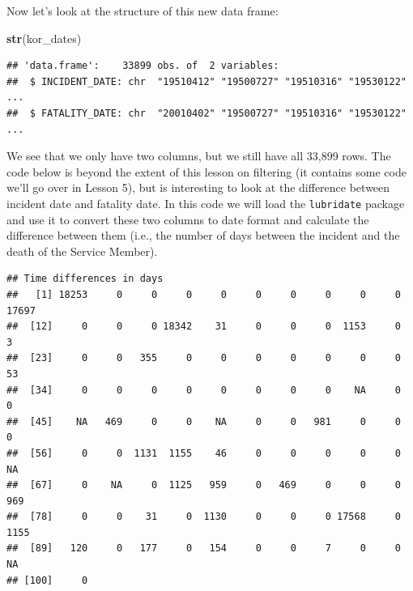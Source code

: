 \documentclass[]{book}
\newenvironment{Shaded}{\begin{snugshade}}{\end{snugshade}}
\newcommand{\KeywordTok}[1]{\textcolor[rgb]{0.13,0.29,0.53}{\textbf{{#1}}}}
\newcommand{\DecValTok}[1]{\textcolor[rgb]{0.00,0.00,0.81}{{#1}}}
\newcommand{\StringTok}[1]{\textcolor[rgb]{0.31,0.60,0.02}{{#1}}}
\newcommand{\NormalTok}[1]{{#1}}
\begin{document}
Now let's look at the structure of this new data frame:

\begin{Shaded}
\begin{Highlighting}[]
\KeywordTok{str}\NormalTok{(kor_dates)}
\end{Highlighting}
\end{Shaded}

\begin{verbatim}
## 'data.frame':    33899 obs. of  2 variables:
##  $ INCIDENT_DATE: chr  "19510412" "19500727" "19510316" "19530122" ...
##  $ FATALITY_DATE: chr  "20010402" "19500727" "19510316" "19530122" ...
\end{verbatim}

We see that we only have two columns, but we still have all 33,899 rows.
The code below is beyond the extent of this lesson on filtering (it
contains some code we'll go over in Lesson 5), but is interesting to
look at the difference between incident date and fatality date. In this
code we will load the \texttt{lubridate} package \citep{R-lubridate} and
use it to convert these two columns to date format and calculate the
difference between them (i.e., the number of days between the incident
and the death of the Service Member).

\begin{Shaded}
\end{Shaded}

\begin{verbatim}
## Time differences in days
##   [1] 18253     0     0     0     0     0     0     0     0     0 17697
##  [12]     0     0     0 18342    31     0     0     0  1153     0     3
##  [23]     0     0   355     0     0     0     0     0     0     0    53
##  [34]     0     0     0     0     0     0     0     0    NA     0     0
##  [45]    NA   469     0     0    NA     0     0   981     0     0     0
##  [56]     0     0  1131  1155    46     0     0     0     0     0    NA
##  [67]     0    NA     0  1125   959     0   469     0     0     0   969
##  [78]     0     0    31     0  1130     0     0     0 17568     0  1155
##  [89]   120     0   177     0   154     0     0     7     0     0    NA
## [100]     0
\end{verbatim}
\end{document}
